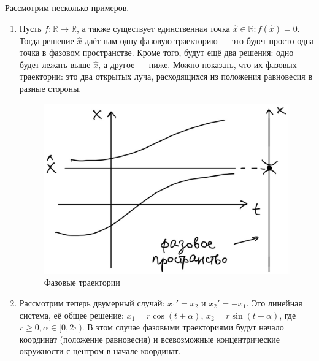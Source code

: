 Рассмотрим несколько примеров.
\begin{enumerate}
    \item Пусть $f\colon \mathbb{R} \to \mathbb{R}$, а также существует единственная точка $\widehat x \in \mathbb{R}:f(\widehat x) = 0$.
    Тогда решение $\widehat{x}$ даёт нам одну фазовую траекторию --- это будет просто одна точка в фазовом пространстве. Кроме того, будут ещё два решения:
    одно будет лежать выше $\widehat{x}$, а другое --- ниже. Можно показать, что их фазовых траектории: это два открытых луча, расходящихся из положения равновесия
    в разные стороны.
    \begin{figure}[h]
        \includegraphics[scale=0.25]{trajectory-example}
        \centering
        \caption{Фазовые траектории}
    \end{figure}
    \item Рассмотрим теперь двумерный случай: $x_1'=x_2$ и $x_2'=-x_1$. Это линейная система, её общее решение: $x_1 = r\cos(t + \alpha)$, $x_2 = r\sin(t + \alpha)$, где $r \geq 0, \alpha \in [0, 2\pi)$.
    В этом случае фазовыми траекториями будут начало координат (положение равновесия) и всевозможные концентрические окружности с центром в начале координат.
\end{enumerate}

